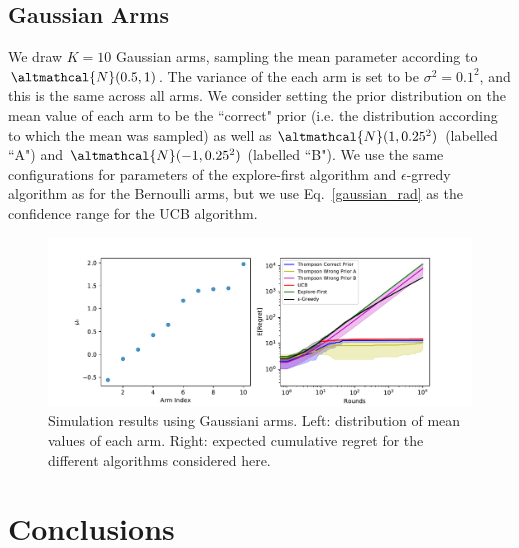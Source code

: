 \documentclass[a4paper]{article}
\begin{document}
	\subsection{Gaussian Arms}
	We draw $K=10$ Gaussian arms, sampling the mean parameter according to $\altmathcal{N}(0.5, 1)$. The variance of the each arm is set to be $\sigma^2 = 0.1^2$, and this is the same across all arms. We consider setting the prior distribution on the mean value of each arm to be the ``correct" prior (i.e. the distribution according to which the mean was sampled) as well as $\altmathcal{N}(1, 0.25^2)$ (labelled ``A") and $\altmathcal{N}(-1, 0.25^2)$ (labelled ``B").  We use the same configurations for parameters of the explore-first algorithm and $\epsilon$-grredy algorithm as for the Bernoulli arms, but we use Eq.~\eqref{gaussian_rad} as the confidence range for the UCB algorithm. 
	\begin{figure}[H]
		\includegraphics[width=\textwidth]{gaussian}
		\centering
		\caption{\label{gaussian} Simulation results using Gaussiani arms. Left: distribution of mean values of each arm. Right: expected cumulative regret for the different algorithms considered here.}
	\end{figure}
	\section{Conclusions}


\end{document}
